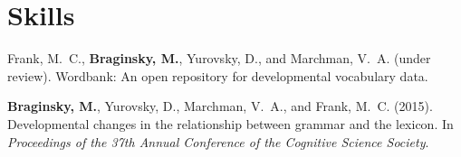 \documentclass[11pt,letter]{moderncv}
\begin{document}
\section{Skills}

\vspace*{0.25em}


\renewcommand{\refname}{Publications}

\begin{small}
\begin{thebibliography}{}

Frank, M.~C., \textbf{Braginsky, M.}, Yurovsky, D., and Marchman, V.~A. (under review).
\newblock Wordbank: An open repository for developmental vocabulary data.

\textbf{Braginsky, M.}, Yurovsky, D., Marchman, V.~A., and Frank, M.~C. (2015).
\newblock Developmental changes in the relationship between grammar and the
  lexicon.
\newblock In {\em Proceedings of the 37th Annual Conference of the Cognitive
  Science Society}.

\end{thebibliography}
\end{small}

\renewcommand{\refname}{Posters and Talks}
\end{document}
